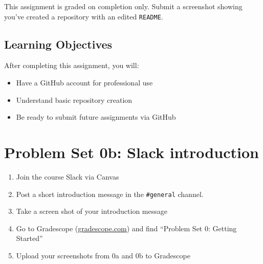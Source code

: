 \documentclass[
  11pt,
  letterpaper]{article}
\providecommand{\tightlist}{%
  \setlength{\itemsep}{0pt}\setlength{\parskip}{0pt}}
\begin{document}
This assignment is graded on completion only. Submit a screenshot
showing you've created a repository with an edited \texttt{README}.

\subsection{Learning Objectives}\label{learning-objectives}

After completing this assignment, you will:

\begin{itemize}
\tightlist
\item
  Have a GitHub account for professional use
\item
  Understand basic repository creation
\item
  Be ready to submit future assignments via GitHub
\end{itemize}

\section{Problem Set 0b: Slack
introduction}\label{problem-set-0b-slack-introduction}

\begin{enumerate}
\def\labelenumi{\arabic{enumi}.}
\tightlist
\item
  Join the course Slack via Canvas
\item
  Post a short introduction message in the \texttt{\#general} channel.
\item
  Take a screen shot of your introduction message
\item
  Go to Gradescope (\url{gradescope.com}) and find ``Problem Set 0:
  Getting Started''
\item
  Upload your screenshots from 0a and 0b to Gradescope
\end{enumerate}
\end{document}
